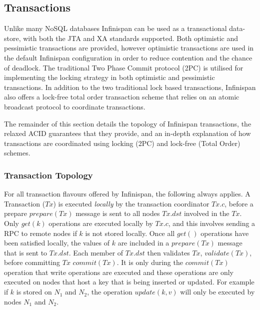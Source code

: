 %    
    \subsection{Transactions}
    Unlike many NoSQL databases Infinispan can be used as a transactional data-store, with both the JTA\citep{JTA} and XA\citep{XA} standards supported.  Both optimistic\citep{Kung:1981:OMC:319566.319567} and pessimistic transactions\citep{Bernstein:1981:CCD:356842.356846} are provided, however optimistic transactions are used in the default Infinispan configuration in order to reduce contention and the chance of deadlock.  The traditional Two Phase Commit protocol (2PC)\citep{Bernstein:1996:PTP:261193} is utilised for implementing the locking strategy in both optimistic and pessimistic transactions.  In addition to the two traditional lock based transactions, Infinispan also offers a lock-free total order transaction scheme that relies on an atomic broadcast protocol to coordinate transactions.  
	    
    The remainder of this section details the topology of Infinispan transactions, the relaxed ACID guarantees that they provide, and an in-depth explanation of how transactions are coordinated using locking (2PC) and lock-free (Total Order) schemes. 
    
		\subsubsection{Transaction Topology}
		For all transaction flavours offered by Infinispan, the following always applies.  A Transaction ($Tx$) is executed \emph{locally} by the transaction coordinator $Tx.c$, before a prepare $prepare(Tx)$ message is sent to all nodes $Tx.dst$ involved in the $Tx$.  Only $get(k)$ operations are executed locally by $Tx.c$, and this involves sending a RPC to remote nodes if $k$ is not stored locally.  Once all $get()$ operations have been satisfied locally, the values of $k$ are included in a $prepare(Tx)$ message that is sent to $Tx.dst$.  Each member of $Tx.dst$ then validates $Tx$, $validate(Tx)$, before committing $Tx$ $commit(Tx)$.  It is only during the $commit(Tx)$ operation that write operations are executed and these operations are only executed on nodes that host a key that is being inserted or updated.  For example if $k$ is stored on $N_1$ and $N_2$, the operation $update(k, v)$ will only be executed by nodes $N_1$ and $N_2$.  
		
